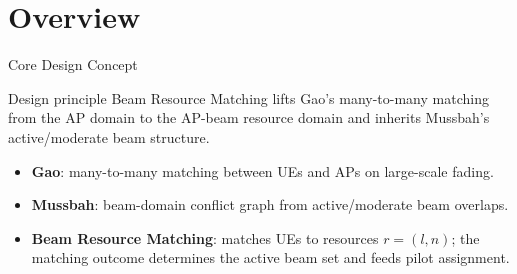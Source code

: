 \documentclass[10pt,aspectratio=169]{beamer}
\newcommand{\BRM}{Beam Resource Matching}
\newenvironment{tightitemize}{%
    \begin{itemize}
        \setlength{\itemsep}{2pt}
        \setlength{\parskip}{0pt}
        \setlength{\parsep}{0pt}
}{%
    \end{itemize}
}
\begin{document}
\section{Overview}

\begin{frame}{Core Design Concept}
    \small
    \begin{block}{Design principle}
        \BRM{} lifts Gao's many-to-many matching from the AP domain to the AP-beam
        resource domain and inherits Mussbah's active/moderate beam structure.
    \end{block}

    \vspace{0.5em}
    \begin{center}
    \end{center}

    \vspace{0.3em}
    \begin{tightitemize}
        \item \textbf{Gao}: many-to-many matching between UEs and APs on large-scale fading.
        \item \textbf{Mussbah}: beam-domain conflict graph from active/moderate beam overlaps.
        \item \textbf{\BRM{}}: matches UEs to resources \(r=(l,n)\); the matching outcome determines the active beam set and feeds pilot assignment.
    \end{tightitemize}
\end{frame}
\end{document}
